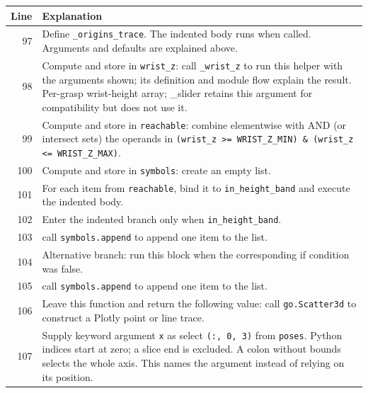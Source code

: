 \documentclass[11pt,a4paper]{book}
\begin{document}
\begin{longtable}{r p{}}

\textbf{Line} & \textbf{Explanation} \\ \hline \endhead

97 & Define \texttt{\_origins\_trace}. The indented body runs when called. Arguments and defaults are explained above. \\

98 & Compute and store in \texttt{wrist\_z}: call \texttt{\_wrist\_z} to run this helper with the arguments shown; its definition and module flow explain the result. Per-grasp wrist-height array; \_slider retains this argument for compatibility but does not use it. \\

99 & Compute and store in \texttt{reachable}: combine elementwise with AND (or intersect sets) the operands in \texttt{(wrist\_z >= WRIST\_Z\_MIN) \& (wrist\_z <= WRIST\_Z\_MAX)}.  \\

100 & Compute and store in \texttt{symbols}: create an empty list.  \\

101 & For each item from \texttt{reachable}, bind it to \texttt{in\_height\_band} and execute the indented body. \\

102 & Enter the indented branch only when \texttt{in\_height\_band}. \\

103 & call \texttt{symbols.append} to append one item to the list. \\

104 & Alternative branch: run this block when the corresponding if condition was false. \\

105 & call \texttt{symbols.append} to append one item to the list. \\

106 & Leave this function and return the following value: call \texttt{go.Scatter3d} to construct a Plotly point or line trace. \\

107 & Supply keyword argument \texttt{x} as select \texttt{(:, 0, 3)} from \texttt{poses}. Python indices start at zero; a slice end is excluded. A colon without bounds selects the whole axis. This names the argument instead of relying on its position. \\


\end{longtable}
\end{document}

